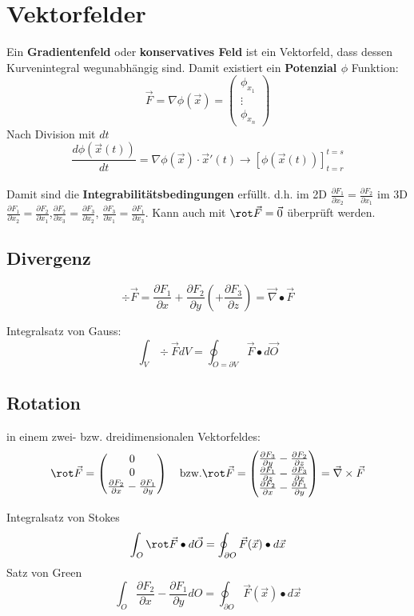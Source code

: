 \section{Vektorfelder}
\label{konservativ}
Ein \textbf{Gradientenfeld} oder \textbf{konservatives Feld} ist ein Vektorfeld, dass dessen Kurvenintegral wegunabhängig sind. Damit existiert ein \textbf{Potenzial $\phi$} Funktion:
\[
\vec{F} = \nabla\phi(\vec{x})= \begin{pmatrix}
	\phi_{x_1} \\\vdots \\ 	\phi_{x_n}
\end{pmatrix}
\]
Nach Division mit $dt$
\[
\frac{d\phi(\vec{x}(t))}{dt} = \nabla\phi(\vec{x})\cdot \vec{x}'(t) \xrightarrow{} [\phi(\vec{x}(t))]_{t=r}^{t=s}
\]
~\\

\noindent Damit sind die \textbf{Integrabilitätsbedingungen} erfüllt. d.h. im 2D $\frac{\partial F_1}{\partial x_2} = \frac{\partial F_2}{\partial x_1}$ im 3D $\frac{\partial F_1}{\partial x_2} = \frac{\partial F_2}{\partial x_1}$,$\frac{\partial F_2}{\partial x_3} = \frac{\partial F_3}{\partial x_2}$, $\frac{\partial F_3}{\partial x_1} = \frac{\partial F_1}{\partial x_3}$. Kann auch mit $\rot\vec{F} = \vec{0}$ überprüft werden.


\subsection{Divergenz}
\[
\div \vec{F} = \frac{\partial F_1}{\partial x} + \frac{\partial F_2}{\partial y} \left( + \frac{\partial F_3}{\partial z}\right) = \vec{\nabla} \bullet \vec{F}
\]

\noindent Integralsatz von Gauss:
\[
\int_V\div\vec{F}dV = \oint_{O = \partial V}\vec{F}\bullet d\vec{O}
\]


\subsection{Rotation} in einem zwei- bzw. dreidimensionalen Vektorfeldes:
\[
\rot\vec{F} = \begin{pmatrix}
	0 \\0 \\ \frac{\partial F_2}{\partial x} - \frac{\partial F_1}{\partial y}
\end{pmatrix} \quad \text{bzw.} \rot\vec{F} = \begin{pmatrix}
\frac{\partial F_3}{\partial y} - \frac{\partial F_2}{\partial z} \\
\frac{\partial F_1}{\partial z} - \frac{\partial F_3}{\partial x} \\
\frac{\partial F_2}{\partial x} - \frac{\partial F_1}{\partial y}
\end{pmatrix}
= \vec{\nabla}\times \vec{F}
\]


\noindent Integralsatz von Stokes
\[
\int_O\rot\vec{F}\bullet d\vec{O} = \oint_{ \partial O}\vec{F}(\vec{x})\bullet d\vec{x}
\]
\noindent Satz von Green
\[
\int_O\frac{\partial F_2}{\partial x} - \frac{\partial F_1}{\partial y} dO = \oint_{\partial O}\vec{F}(\vec{x})\bullet d\vec{x}
\]